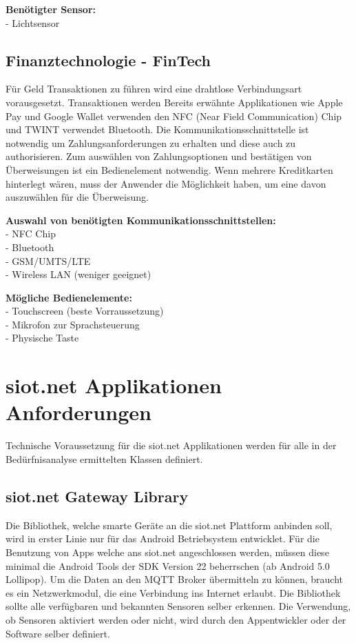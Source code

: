 \textbf{Benötigter Sensor:}\\
- Lichtsensor

\subsection{Finanztechnologie - FinTech}
Für Geld Transaktionen zu führen wird eine drahtlose Verbindungsart vorausgesetzt. Transaktionen werden Bereits erwähnte Applikationen wie Apple Pay und Google Wallet verwenden den NFC (Near Field Communication) Chip und TWINT verwendet Bluetooth. Die Kommunikationsschnittstelle ist notwendig um Zahlungsanforderungen zu erhalten und diese auch zu authorisieren. Zum auswählen von Zahlungsoptionen und bestätigen von Überweisungen ist ein Bedienelement notwendig. Wenn mehrere Kreditkarten hinterlegt wären, muss der Anwender die Möglichkeit haben, um eine davon auszuwählen für die Überweisung.

\textbf{Auswahl von benötigten Kommunikationsschnittstellen:}\\
- NFC Chip\\
- Bluetooth\\
- GSM/UMTS/LTE\\
- Wireless LAN (weniger geeignet)

\textbf{Mögliche Bedienelemente:}\\
- Touchscreen (beste Vorraussetzung)\\
- Mikrofon zur Sprachsteuerung\\
- Physische Taste

\section{siot.net Applikationen Anforderungen}
Technische Voraussetzung für die siot.net Applikationen werden für alle in der Bedürfnisanalyse ermittelten Klassen definiert.

\subsection{siot.net Gateway Library}
Die Bibliothek, welche smarte Geräte an die siot.net Plattform anbinden soll, wird in erster Linie nur für das Android Betriebsystem entwicklet. Für die Benutzung von Apps welche ans siot.net angeschlossen werden, müssen diese minimal die Android Tools der SDK Version 22 beherrschen (ab Android 5.0 Lollipop). Um die Daten an den MQTT Broker übermitteln zu können, braucht es ein Netzwerkmodul, die eine Verbindung ins Internet erlaubt. Die Bibliothek sollte alle verfügbaren und bekannten Sensoren selber erkennen. Die Verwendung, ob Sensoren aktiviert werden oder nicht, wird durch den Appentwickler oder der Software selber definiert.

